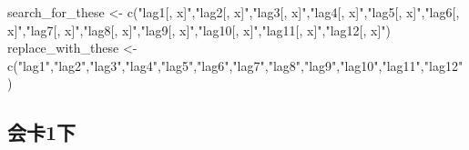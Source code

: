 \documentclass[
]{article}
\newenvironment{Shaded}{\begin{snugshade}}{\end{snugshade}}
\newcommand{\AttributeTok}[1]{\textcolor[rgb]{0.77,0.63,0.00}{#1}}
\newcommand{\ConstantTok}[1]{\textcolor[rgb]{0.00,0.00,0.00}{#1}}
\newcommand{\ControlFlowTok}[1]{\textcolor[rgb]{0.13,0.29,0.53}{\textbf{#1}}}
\newcommand{\DecValTok}[1]{\textcolor[rgb]{0.00,0.00,0.81}{#1}}
\newcommand{\FunctionTok}[1]{\textcolor[rgb]{0.00,0.00,0.00}{#1}}
\newcommand{\NormalTok}[1]{#1}
\newcommand{\OtherTok}[1]{\textcolor[rgb]{0.56,0.35,0.01}{#1}}
\newcommand{\SpecialCharTok}[1]{\textcolor[rgb]{0.00,0.00,0.00}{#1}}
\newcommand{\StringTok}[1]{\textcolor[rgb]{0.31,0.60,0.02}{#1}}
\begin{document}
\begin{Shaded}
\begin{Highlighting}[]
\NormalTok{search\_for\_these }\OtherTok{\textless{}{-}} \FunctionTok{c}\NormalTok{(}\StringTok{"lag1[, x]"}\NormalTok{,}\StringTok{"lag2[, x]"}\NormalTok{,}\StringTok{"lag3[, x]"}\NormalTok{,}\StringTok{"lag4[, x]"}\NormalTok{,}\StringTok{"lag5[, x]"}\NormalTok{,}\StringTok{"lag6[, x]"}\NormalTok{,}\StringTok{"lag7[, x]"}\NormalTok{,}\StringTok{"lag8[, x]"}\NormalTok{,}\StringTok{"lag9[, x]"}\NormalTok{,}\StringTok{"lag10[, x]"}\NormalTok{,}\StringTok{"lag11[, x]"}\NormalTok{,}\StringTok{"lag12[, x]"}\NormalTok{)}
\NormalTok{ replace\_with\_these }\OtherTok{\textless{}{-}} \FunctionTok{c}\NormalTok{(}\StringTok{"lag1"}\NormalTok{,}\StringTok{"lag2"}\NormalTok{,}\StringTok{"lag3"}\NormalTok{,}\StringTok{"lag4"}\NormalTok{,}\StringTok{"lag5"}\NormalTok{,}\StringTok{"lag6"}\NormalTok{,}\StringTok{"lag7"}\NormalTok{,}\StringTok{"lag8"}\NormalTok{,}\StringTok{"lag9"}\NormalTok{,}\StringTok{"lag10"}\NormalTok{,}\StringTok{"lag11"}\NormalTok{,}\StringTok{"lag12"}\NormalTok{)}
\end{Highlighting}
\end{Shaded}

\hypertarget{ux4f1aux53611ux4e0b}{%
\subsection{会卡1下}\label{ux4f1aux53611ux4e0b}}

\begin{Shaded}
\end{Shaded}
\end{document}
